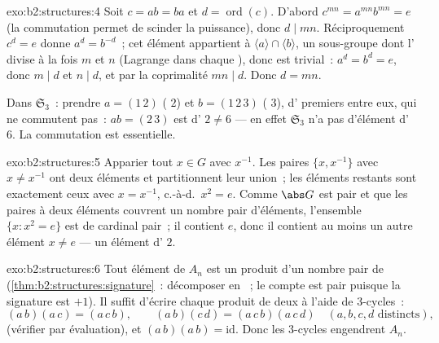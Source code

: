 \begin{solution}{exo:b2:structures:4}
Soit $c = ab = ba$ et $d = \operatorname{ord}(c)$. D'abord $c^{mn} =
a^{mn} b^{mn} = e$ (la commutation permet de scinder la puissance),
donc $d \mid mn$. Réciproquement $c^d = e$ donne $a^d = b^{-d}$~; cet
élément appartient à $\langle a\rangle \cap \langle b\rangle$, un
sous-groupe dont l' divise à la fois $m$ et $n$ (Lagrange dans
chaque ), donc est trivial~: $a^d = b^d = e$, donc $m
\mid d$ et $n \mid d$, et par la coprimalité $mn \mid d$. Donc $d = mn$.

Dans $\mathfrak{S}_3$~: prendre $a = (1\,2)$ ( $2$) et $b =
(1\,2\,3)$ ( $3$), d' premiers entre eux, qui ne commutent
pas~: $ab = (2\,3)$ est d' $2 \neq 6$ --- en effet
$\mathfrak{S}_3$ n'a pas d'élément d' $6$. La commutation est
essentielle.
\end{solution}

\begin{solution}{exo:b2:structures:5}
Apparier tout $x \in G$ avec $x^{-1}$. Les paires $\{x, x^{-1}\}$ avec
$x \neq x^{-1}$ ont deux éléments et partitionnent leur union~; les
éléments restants sont exactement ceux avec $x = x^{-1}$, c.-à-d.\ $x^2
= e$. Comme $\abs G$ est pair et que les paires à deux éléments
couvrent un nombre pair d'éléments, l'ensemble $\{x : x^2 = e\}$ est de
cardinal pair~; il contient $e$, donc il contient au moins un autre
élément $x \neq e$ --- un élément d' $2$.
\end{solution}

\begin{solution}{exo:b2:structures:6}
Tout élément de $A_n$ est un produit d'un nombre pair de
 (\cref{thm:b2:structures:signature}~: décomposer en
~; le compte est pair puisque la signature est $+1$). Il
suffit d'écrire chaque produit de deux  à l'aide de
$3$-cycles~:
\[
(a\,b)(a\,c) = (a\,c\,b),
\qquad
(a\,b)(c\,d) = (a\,c\,b)(a\,c\,d) \quad (a,b,c,d \text{ distincts}),
\]
(vérifier par évaluation), et $(a\,b)(a\,b) = \mathrm{id}$. Donc les
$3$-cycles engendrent $A_n$.
\end{solution}

